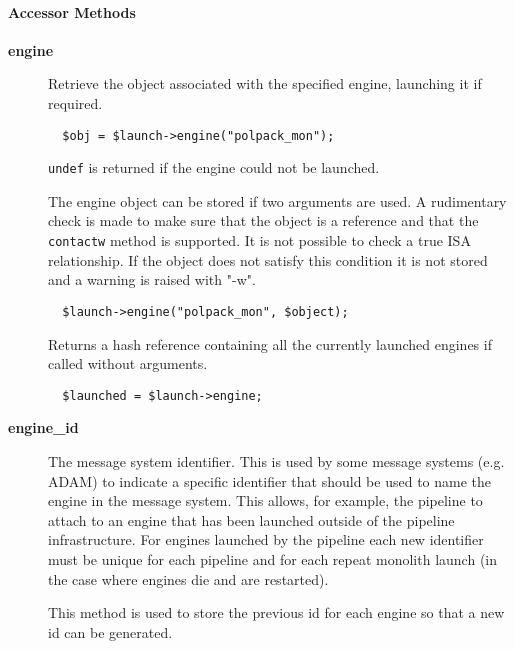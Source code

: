 \paragraph*{Accessor Methods\label{ORAC::Msg::EngineLaunch_Accessor_Methods}}
\begin{description}

\item[\textbf{engine}] \mbox{}

Retrieve the object associated with the specified engine, launching
it if required.

\begin{verbatim}
  $obj = $launch->engine("polpack_mon");
\end{verbatim}


\texttt{undef} is returned if the engine could not be launched.



The engine object can be stored if two arguments are used.
A rudimentary check is made to make sure that the object
is a reference and that the \texttt{contactw} method is supported.
It is not possible to check a true ISA relationship. If the
object does not satisfy this condition it is not stored and
a warning is raised with "-w".

\begin{verbatim}
  $launch->engine("polpack_mon", $object);
\end{verbatim}


Returns a hash reference containing all the currently launched engines
if called without arguments.

\begin{verbatim}
  $launched = $launch->engine;
\end{verbatim}

\item[\textbf{engine\_id}] \mbox{}

The message system identifier. This is used by some message systems
(e.g. ADAM) to indicate a specific identifier that should be used
to name the engine in the message system. This allows, for example,
the pipeline to attach to an engine that has been launched
outside of the pipeline infrastructure. For engines launched
by the pipeline each new identifier must be unique for each pipeline
and for each repeat monolith launch (in the case where engines
die and are restarted).



This method is used to store the previous id for each engine so that
a new id can be generated.


\end{description}
